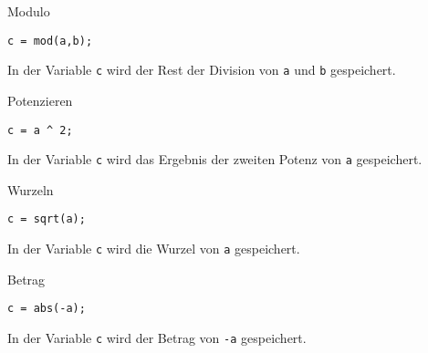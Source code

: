                \begin{CodeErklaerungBox}{Modulo}
                \begin{lstlisting}
c = mod(a,b);
                \end{lstlisting}
                \tcblower
                In der Variable \texttt{c} wird der Rest der Division von \texttt{a} und \texttt{b} gespeichert.
                \end{CodeErklaerungBox}
                \begin{CodeErklaerungBox}{Potenzieren}
                \begin{lstlisting}
c = a ^ 2;
                \end{lstlisting}
                \tcblower
                In der Variable \texttt{c} wird das Ergebnis der zweiten Potenz von \texttt{a} gespeichert.
                \end{CodeErklaerungBox}
                \begin{CodeErklaerungBox}{Wurzeln}
                \begin{lstlisting}
c = sqrt(a);
                \end{lstlisting}
                \tcblower
                In der Variable \texttt{c} wird die Wurzel von \texttt{a} gespeichert.
                \end{CodeErklaerungBox}
                \begin{CodeErklaerungBox}{Betrag}
                \begin{lstlisting}
c = abs(-a);
                \end{lstlisting}
                \tcblower
                In der Variable \texttt{c} wird der Betrag von \texttt{-a} gespeichert.
                \end{CodeErklaerungBox}
